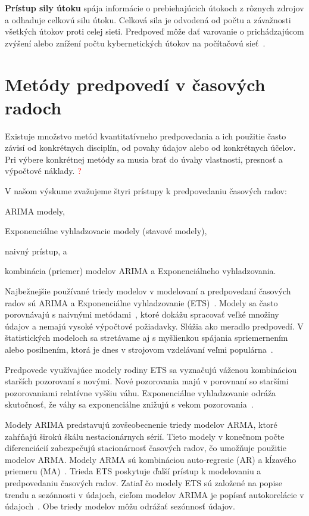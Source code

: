\documentclass[thesismargins, thesislinespacing, openright, upjsfrontpage, combineabstracts]{rnthesis}
\begin{document}
\textbf{Prístup sily útoku} spája informácie o prebiehajúcich útokoch z rôznych zdrojov a odhaduje celkovú silu útoku. Celková sila je odvodená od počtu a závažnosti všetkých útokov proti celej sieti. Predpoveď môže dať varovanie o prichádzajúcom zvýšení alebo znížení počtu kybernetických útokov na počítačovú sieť~\cite{Husak2018survey}.

\section{Metódy predpovedí v časových radoch}

Existuje množstvo metód kvantitatívneho predpovedania a ich použitie často závisí od konkrétnych disciplín, od povahy údajov alebo od konkrétnych účelov. Pri výbere konkrétnej metódy sa musia brať do úvahy vlastnosti, presnosť a výpočtové náklady. \textcolor{red}{?}

V našom výskume zvažujeme štyri prístupy k predpovedaniu časových radov: 
\begin{compactenum}
    \item ARIMA modely,
    \item Exponenciálne vyhladzovacie modely (stavové modely),
    \item naivný prístup, a 
    \item kombinácia (priemer) modelov ARIMA a Exponenciálneho vyhladzovania.
\end{compactenum}

Najbežnejšie používané triedy modelov v modelovaní a predpovedaní časových radov sú ARIMA a Exponenciálne vyhladzovanie (ETS)~\cite{hyndman2018forecasting}. Modely sa často porovnávajú s naivnými metódami~\cite{brockwell2016introduction, box2015time}, ktoré dokážu spracovať veľké množiny údajov a nemajú vysoké výpočtové požiadavky. Slúžia ako meradlo predpovedí. V štatistických modeloch sa stretávame aj s myšlienkou spájania spriemernením alebo posilnením, ktorá je dnes v strojovom vzdelávaní veľmi populárna~\cite{Husak2018survey}. 

Predpovede využívajúce modely rodiny ETS sa vyznačujú váženou kombináciou starších pozorovaní s novými. Nové pozorovania majú v porovnaní so staršími pozorovaniami relatívne vyššiu váhu. Exponenciálne vyhladzovanie odráža skutočnosť, že váhy sa exponenciálne znižujú s vekom pozorovania~\cite{hyndman2018forecasting,brockwell2016introduction}.

Modely ARIMA predstavujú zovšeobecnenie triedy modelov ARMA, ktoré zahŕňajú širokú škálu nestacionárnych sérií. Tieto modely v konečnom počte diferenciácií zabezpečujú stacionárnosť časových radov, čo umožňuje použitie modelov ARMA. Modely ARMA sú kombináciou auto-regresie (AR) a kĺzavého priemeru (MA)~\cite{box2015time}. Trieda ETS poskytuje ďalší prístup k modelovaniu a predpovedaniu časových radov. Zatiaľ čo modely ETS sú založené na popise trendu a sezónnosti v údajoch, cieľom modelov ARIMA je popísať autokorelácie v údajoch~\cite{hyndman2018forecasting}. Obe triedy modelov môžu odrážať sezónnosť údajov.
\end{document}
